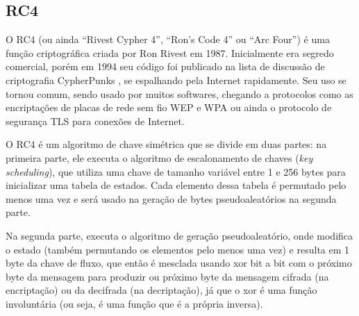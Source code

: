 
\subsection*{RC4}

O RC4 (ou ainda ``Rivest Cypher 4'', ``Ron's Code 4'' ou ``Arc Four'') é uma função
criptográfica criada por Ron Rivest em 1987. Inicialmente era segredo comercial, porém
em 1994 seu código foi publicado na lista de discussão de criptografia CypherPunks
\cite{site:rc4-code}, se espalhando pela Internet rapidamente. Seu uso se tornou comum,
sendo usado por muitos softwares, chegando a protocolos como as encriptações de placas
de rede sem fio WEP e WPA ou ainda o protocolo de segurança TLS para conexões de
Internet.

O RC4 é um algoritmo de chave simétrica que se divide em duas partes: na primeira
parte, ele executa o algoritmo de escalonamento de chaves (\emph{key scheduling}),
que utiliza uma chave de tamanho variável entre 1 e 256 bytes para inicializar uma
tabela de estados. Cada elemento dessa tabela é permutado pelo menos uma vez e será
usado na geração de bytes pseudoaleatórios na segunda parte.

Na segunda parte, executa o algoritmo de geração pseudoaleatório, onde modifica o estado
(também permutando os elementos pelo menos uma vez) e resulta em 1 byte da chave de
fluxo, que então é mesclada usando \gls{xor} bit a bit com o próximo byte da mensagem
para produzir ou próximo byte da mensagem cifrada (na encriptação) ou da decifrada (na
decriptação), já que o \gls*{xor} é uma função involuntária (ou seja, é uma função que
é a própria inversa).



